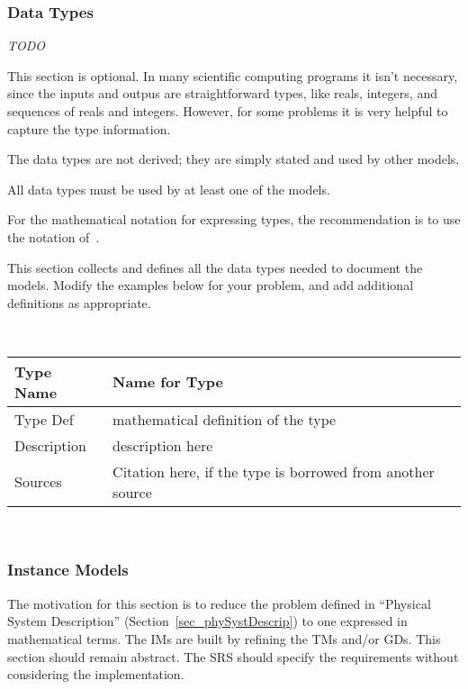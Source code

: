 \documentclass[12pt]{article}
\newcommand{\colAwidth}{0.13\textwidth}
\newcommand{\colBwidth}{0.82\textwidth}
\begin{document}
\subsubsection{Data Types}\label{sec_datatypes}

\emph{TODO}

This section is optional.  In many scientific computing programs it isn't
necessary, since the inputs and outpus are straightforward types, like reals,
integers, and sequences of reals and integers.  However, for some problems it is
very helpful to capture the type information.

The data types are not derived; they are simply stated and used by other models.

All data types must be used by at least one of the models.

For the mathematical notation for expressing types, the recommendation is to use
the notation of~\citet{HoffmanAndStrooper1995}.

This section collects and defines all the data types needed to document the
models. Modify the examples below for your problem, and add additional
definitions as appropriate.

~\newline

\noindent
\begin{minipage}{\textwidth}
\renewcommand*{\arraystretch}{1.5}
\begin{tabular}{| p{\colAwidth} | p{\colBwidth}|}
  \hline
  \rowcolor[gray]{0.9}
  Type Name & Name for Type\\
  \hline
  Type Def & mathematical definition of the type\\
  \hline
  Description & description here
  \\
  \hline
  Sources & Citation here, if the type is borrowed from another source\\
  \hline
\end{tabular}
\end{minipage}\\

\subsubsection{Instance Models} \label{sec_instance}    

The motivation for this section is to reduce the problem defined in ``Physical
System Description'' (Section~\ref{sec_phySystDescrip}) to one expressed in
mathematical terms. The IMs are built by refining the TMs and/or GDs.  This
section should remain abstract.  The SRS should specify the requirements without
considering the implementation.
\end{document}
